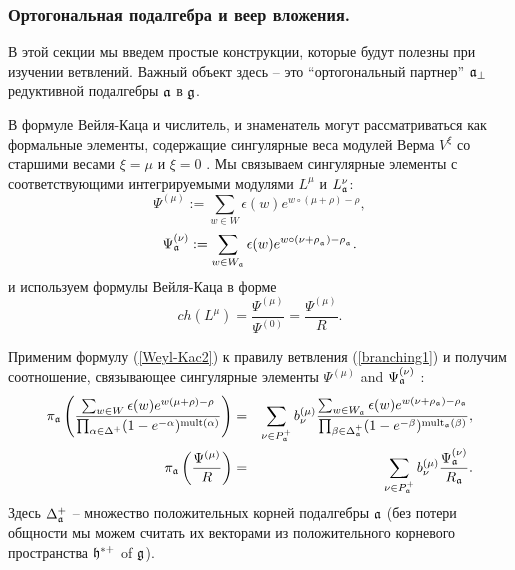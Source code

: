 \subsubsection{Ортогональная подалгебра и веер вложения.}
\label{subsec:branching-orthog-pair}

В этой секции мы введем простые конструкции, которые будут полезны при изучении ветвлений. Важный объект здесь -- это ``ортогональный партнер''  $\mathfrak{a}_{\perp}$ редуктивной подалгебры $\mathfrak{a}$ в  $\mathfrak{g}$.

В формуле Вейля-Каца и числитель, и знаменатель могут рассматриваться как формальные элементы, содержащие сингулярные веса модулей Верма $V^{\xi}$ со старшими весами  $\xi=\mu$ и $\xi=0$ \cite{humphreys1997introduction}.
Мы связываем сингулярные элементы с соответствующими интегрируемыми модулями  $L^{\mu }$ и $L_{\mathfrak{a}}^{\nu }$:
\begin{equation*}
\Psi ^{\left( \mu \right) }:=\sum\limits_{w\in W}\epsilon (w)e^{w\circ (\mu +\rho )-\rho },
\end{equation*}
\begin{equation*}
\Psi _{ \mathfrak{a}}^{\left( \nu \right) }:= \sum\limits_{w\in W_{\mathfrak{a}}}\epsilon (w)e^{w\circ (\nu +\rho_{_{\mathfrak{a}}})-\rho _{_{\mathfrak{a}}}}.
\end{equation*}
и используем формулы Вейля-Каца в форме
\begin{equation}
\label{Weyl-Kac2}
ch\left( L^{\mu }\right) =\frac{\Psi ^{\left( \mu \right) }}{\Psi ^{\left( 0 \right) }}=\frac{\Psi ^{\left( \mu \right) }}{R}.
\end{equation}

Применим формулу  (\ref{Weyl-Kac2}) к правилу ветвления (\ref{branching1}) и получим соотношение, связывающее сингулярные элементы
 $\Psi ^{\left( \mu \right) }$ and $\Psi _{ \mathfrak{a}}^{\left( \nu \right) }$ :
\begin{eqnarray}
\nonumber
\pi _{\af}\left( \frac{\sum_{w \in W}\epsilon (w )e^{w
(\mu +\rho )-\rho }}{\prod_{\alpha \in \Delta ^{+}}(1-e^{-\alpha })^{\mathrm{%
mult}(\alpha )}}\right) &=&\sum_{\nu \in P_{\af}^{+}}b_{\nu }^{(\mu )}%
\frac{\sum_{w \in W_{\af}}\epsilon (w )e^{w (\nu +\rho _{%
\af})-\rho _{\af}}}{\prod_{\beta \in \Delta _{\af%
}^{+}}(1-e^{-\beta })^{\mathrm{mult}_{\af}(\beta )}},  \label{eq:4} \\
\pi _{\af}\left( \frac{\Psi ^{\left( \mu \right) }}{R}\right)
&=&\sum_{\nu \in P_{\af}^{+}}b_{\nu }^{(\mu )}\frac{\Psi _{ \frak{%
a}}^{\left( \nu \right) }}{R_{\af}}.
\end{eqnarray}
Здесь $\Delta _{\mathfrak{a}}^{+}$ -- множество положительных корней подалгебры $\mathfrak{a}$ (без потери общности мы можем считать их векторами из положительного корневого пространства  $\mathfrak{h}^{\ast  +}$ of $\mathfrak{g}$).


